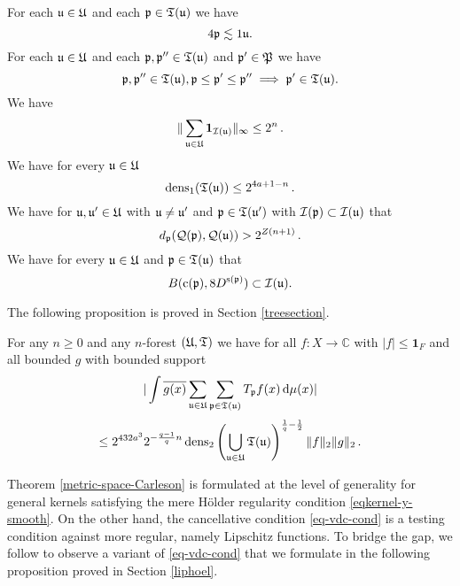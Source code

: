 For each ${\mathfrak u}\in {\mathfrak U}$ and each ${\mathfrak p}\in {\mathfrak T}({\mathfrak u})$
we have
\begin{equation}\label{forest1}
4{\mathfrak p}\lesssim 1{\mathfrak u}.
\end{equation}
For each ${\mathfrak u} \in {\mathfrak U}$ and each ${\mathfrak p},{\mathfrak p}''\in {\mathfrak T}({\mathfrak u})$ and ${\mathfrak p}'\in {\mathfrak P}$
we have
\begin{equation}\label{forest2}
    {\mathfrak p}, {\mathfrak p}'' \in \mathfrak{T}({\mathfrak u}), {\mathfrak p} \leq {\mathfrak p}' \leq {\mathfrak p}'' \implies {\mathfrak p}' \in \mathfrak{T}({\mathfrak u}).
\end{equation}
We have
\begin{equation}\label{forest3}
   \|\sum_{{\mathfrak u}\in {\mathfrak U}} \mathbf{1}_{{\mathcal{I}}({\mathfrak u})}\|_\infty \leq 2^n\,.
\end{equation}
We have for every ${\mathfrak u}\in {\mathfrak U}$
\begin{equation}\label{forest4}
\operatorname{\operatorname{dens}}_1({\mathfrak T}({\mathfrak u}))\le 2^{4a + 1-n}\, .
\end{equation}
We have for ${\mathfrak u}, {\mathfrak u}'\in {\mathfrak U}$ with ${\mathfrak u}\neq {\mathfrak u}'$ and ${\mathfrak p}\in {\mathfrak T}({\mathfrak u}')$ with ${\mathcal{I}}({\mathfrak p})\subset {\mathcal{I}}({\mathfrak u})$ that
\begin{equation}\label{forest5}
d_{{\mathfrak p}}({\mathcal{Q}}({\mathfrak p}), {\mathcal{Q}}({\mathfrak u}))>2^{Z(n+1)}\, .
\end{equation}
We have for every ${\mathfrak u}\in {\mathfrak U}$ and ${\mathfrak p}\in {\mathfrak T}({\mathfrak u})$ that
\begin{equation}\label{forest6}
B({\mathrm{c}}({\mathfrak p}), 8D^{{\mathrm{s}}({\mathfrak p})})\subset {\mathcal{I}}({\mathfrak u}).
\end{equation}


The following proposition is proved in Section \ref{treesection}.
\begin{proposition}
\label{forest-operator}
For any $n\ge 0$ and any $n$-forest $({\mathfrak U},{\mathfrak T})$ we have for all $f: X \to \mathbb{C}$ with $|f| \le \mathbf{1}_F$ and all bounded $g$ with bounded support
$$
    | \int \overline{g(x)} \sum_{{\mathfrak u}\in {\mathfrak U}} \sum_{{\mathfrak p}\in {\mathfrak T}({\mathfrak u})} T_{{\mathfrak p}} f(x) \, \mathrm{d}\mu(x)|
$$
$$
    \le
    2^{432a^3}2^{-\frac{q-1}{q} n} \operatorname{\operatorname{dens}}_2\left(\bigcup_{{\mathfrak u}\in {\mathfrak U}}{\mathfrak T}({\mathfrak u})\right)^{\frac{1}{q}-\frac{1}{2}} \|f\|_2 \|g\|_2 \,.
$$
\end{proposition}

Theorem \ref{metric-space-Carleson} is formulated at the level of generality
for general kernels satisfying the mere H\"older regularity condition \eqref{eqkernel-y-smooth}. On the other hand, the cancellative condition \eqref{eq-vdc-cond} is a testing condition against more regular,
namely Lipschitz functions. To bridge the gap, we follow \cite{zk-polynomial} to observe a variant of \eqref{eq-vdc-cond} that we formulate
in the following proposition proved in Section \ref{liphoel}.


